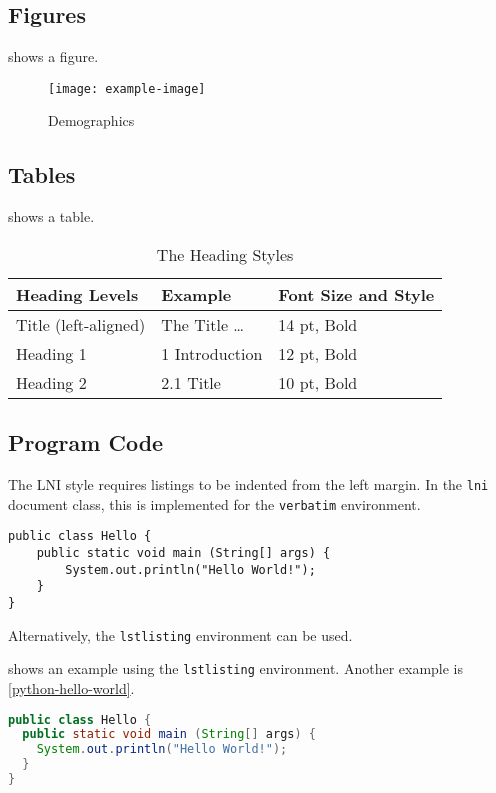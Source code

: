 \documentclass[biblatex]{lni}
\begin{document}
\subsection{Figures}
 shows a figure.

\begin{figure}
  \centering
  \texttt{[image: example-image]}
  \caption{Demographics}
  \label{fig:demo}
\end{figure}

\subsection{Tables}
 shows a table.

\begin{table}
\centering
\begin{tabular}{lll}
\toprule
Heading Levels & Example & Font Size and Style \\
\midrule
Title (left-aligned) & The Title \ldots & 14 pt, Bold\\
Heading 1 & 1 Introduction & 12 pt, Bold\\
Heading 2 & 2.1 Title & 10 pt, Bold\\
\bottomrule
\end{tabular}
\caption{The Heading Styles}
\label{tab:demo}
\end{table}

\subsection{Program Code}
The LNI style requires listings to be indented from the left margin.
In the \texttt{lni} document class, this is implemented for the \texttt{verbatim} environment.

\begin{verbatim}
public class Hello {
    public static void main (String[] args) {
        System.out.println("Hello World!");
    }
}
\end{verbatim}

Alternatively, the \texttt{lstlisting} environment can be used.

 shows an example using the \texttt{lstlisting} environment. Another example is \cref{python-hello-world}.

\begin{lstlisting}[caption={A Java Program}, label=java-hello-world, language=Java]
public class Hello {
  public static void main (String[] args) {
    System.out.println("Hello World!");
  }
}
\end{lstlisting}
\end{document}
